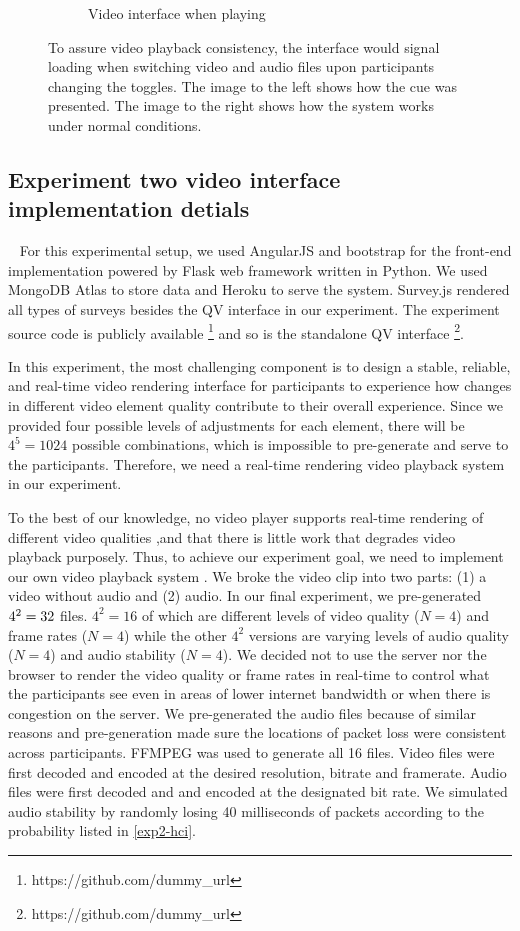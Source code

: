 \begin{figure}
\begin{subfigure}[ht]{0.49\textwidth}
         \caption{Video interface when playing}
         \label{fig:video_playing}
     \end{subfigure}
        \caption{To assure video playback consistency, the interface would signal loading when switching video and audio files upon participants changing the toggles. The image to the left shows how the cue was presented. The image to the right shows how the system works under normal conditions.}
        \label{fig:appendix_video_interface}
\end{figure}

\subsection{Experiment two video interface implementation detials}~\label{appx_video_interface}
For this experimental setup, we used AngularJS and bootstrap for the front-end implementation powered by Flask web framework written in Python. We used MongoDB Atlas to store data and Heroku to serve the system. Survey.js rendered all types of surveys besides the QV interface in our experiment. The experiment source code is publicly available \footnote{https://github.com/dummy\_url} and so is the standalone QV interface \footnote{https://github.com/dummy\_url}.

In this experiment, the most challenging component is to design a stable, reliable, and real-time video rendering interface for participants to experience how changes in different video element quality contribute to their overall experience. Since we provided four possible levels of adjustments for each element, there will be $4^5 = 1024$ possible combinations, which is impossible to pre-generate and serve to the participants. Therefore, we need a real-time rendering video playback system in our experiment. 

To the best of our knowledge, no video player supports real-time rendering of different video qualities ,and that there is little work that degrades video playback purposely. Thus, to achieve our experiment goal, we need to implement our own video playback system . We broke the video clip into two parts: (1) a video without audio and (2) audio. In our final experiment, we pre-generated $4^2 \time 2 = 32$ files. $4^2 =16$ of which are different levels of video quality ($N=4$) and frame rates ($N=4$) while the other $4^2$ versions are  varying levels of audio quality ($N=4$) and audio stability ($N=4$). We decided not to use the server nor the browser to render the video quality or frame rates in real-time to control what the participants see even in areas of lower internet bandwidth or when there is congestion on the server. We pre-generated the audio files because of similar reasons and pre-generation made sure the locations of packet loss were consistent across participants. FFMPEG was used to generate all 16 files. Video files were first decoded and encoded at the desired resolution, bitrate and framerate. Audio files were first decoded and and encoded at the designated bit rate. We simulated audio stability by randomly losing 40 milliseconds of packets according to the probability listed in \ref{exp2-hci}.

